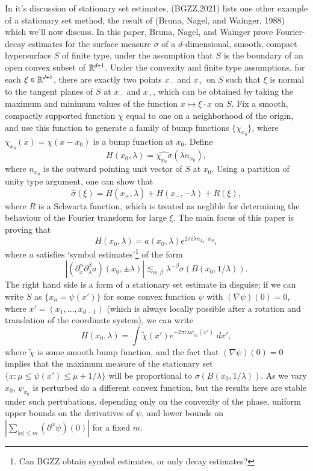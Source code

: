 In it's discussion of stationary set estimates, (BGZZ,2021) lists one other example of a stationary set method, the result of (Bruna, Nagel, and Wainger, 1988) which we'll now discuss. In this paper, Bruna, Nagel, and Wainger prove Fourier-decay estimates for the surface measure $\sigma$ of a $d$-dimensional, smooth, compact hypersurface $S$ of finite type, under the assumption that $S$ is the boundary of an open convex subset of $\operatorname{\mathbb{R}}^{d+1}$. Under the convexity and finite type assumptions, for each $\xi \in \operatorname{\mathbb{R}}^{d+1}$, there are exactly two points $x_-$ and $x_+$ on $S$ such that $\xi$ is normal to the tangent planes of $S$ at $x_-$ and $x_+$, which can be obtained by taking the maximum and minimum values of the function $x \mapsto \xi \cdot x$ on $S$. Fix a smooth, compactly supported function $\chi$ equal to one on a neighborhood of the origin, and use this function to generate a family of bump functions $\{ \chi_{x_0} \}$, where $\chi_{x_0}(x) = \chi(x - x_0)$ is a bump function at $x_0$. Define
%
\[ H(x_0, \lambda) = \widehat{\chi_{x_0} \sigma}(\lambda n_{x_0}), \]
%
where $n_{x_0}$ is the outward pointing unit vector of $S$ at $x_0$. Using a partition of unity type argument, one can show that
%
\[ \widehat{\sigma}(\xi) = H(x_+, \lambda) + H(x_-, - \lambda) + R(\xi), \]
%
where $R$ is a Schwartz function, which is treated as neglible for determining the behaviour of the Fourier transform for large $\xi$. The main focus of this paper is proving that
%
\[ H(x_0, \lambda) = a(x_0,\lambda) e^{2 \pi i \lambda n_{x_0} \cdot x_0}, \]
%
where $a$ satisfies `symbol estimates'\footnote{Can BGZZ obtain symbol estimates, or only decay estimates?} of the form
%
\[ \left| (\partial^\alpha_x \partial^\beta_\lambda a)(x_0, \pm \lambda)\right| \lesssim_{\alpha,\beta} \lambda^{-\beta} \sigma\left( B \left(x_0, 1/\lambda \right) \right). \]
%
The right hand side is a form of a stationary set estimate in disguise; if we can write $S$ as $\{ x_n = \psi(x') \}$ for some convex function $\psi$ with $(\nabla \psi)(0) = 0$, where $x' = (x_1,\dots,x_{d-1})$ (which is always locally possible after a rotation and translation of the coordinate system), we can write
%
\[ H(x_0,\lambda) = \int \tilde{\chi}(x') e^{-2 \pi i \lambda \psi_{x_0}(x')}\; dx', \]
%
where $\tilde{\chi}$ is some smooth bump function, and the fact that $(\nabla \psi)(0) = 0$ implies that the maximum measure of the stationary set $\{ x : \mu \leq \psi(x') \leq \mu + 1/\lambda \}$ will be proportional to $\sigma \left( B(x_0,1/\lambda) \right)$. As we vary $x_0$, $\psi_{x_0}$ is perturbed do a different convex function, but the results here are stable under such pertubations, depending only on the convexity of the phase, uniform upper bounds on the derivatives of $\psi$, and lower bounds on $|\sum_{|\alpha| \leq m} (\partial^\alpha \psi)(0)|$ for a fixed $m$.


